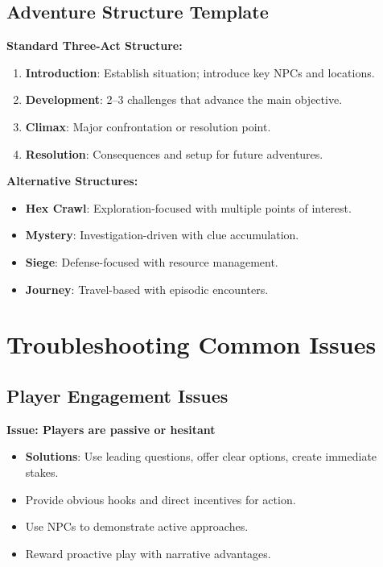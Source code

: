 \subsection{Adventure Structure Template}
\label{subsec:adventure-template}

\textbf{Standard Three-Act Structure:}
\begin{enumerate}
\item \textbf{Introduction}: Establish situation; introduce key NPCs and locations.
\item \textbf{Development}: 2--3 challenges that advance the main objective.
\item \textbf{Climax}: Major confrontation or resolution point.
\item \textbf{Resolution}: Consequences and setup for future adventures.
\end{enumerate}

\textbf{Alternative Structures:}
\begin{itemize}
\item \textbf{Hex Crawl}: Exploration-focused with multiple points of interest.
\item \textbf{Mystery}: Investigation-driven with clue accumulation.
\item \textbf{Siege}: Defense-focused with resource management.
\item \textbf{Journey}: Travel-based with episodic encounters.
\end{itemize}

\section{Troubleshooting Common Issues}
\label{sec:troubleshooting-ref}

\subsection{Player Engagement Issues}
\label{subsec:engagement-issues}

\textbf{Issue: Players are passive or hesitant}
\begin{itemize}
\item \textbf{Solutions}: Use leading questions, offer clear options, create immediate stakes.
\item Provide obvious hooks and direct incentives for action.
\item Use NPCs to demonstrate active approaches.
\item Reward proactive play with narrative advantages.
\end{itemize}


